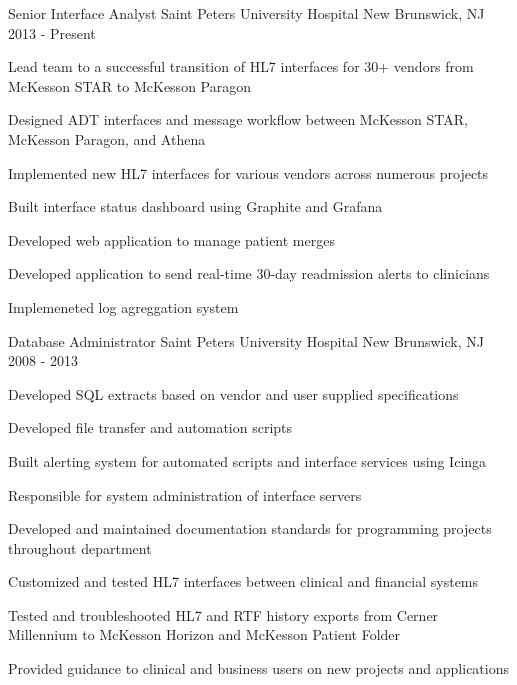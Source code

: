 

\begin{cventries}

  \cventry
  {Senior Interface Analyst} %
  {Saint Peters University Hospital} %
  {New Brunswick, NJ} %
  {2013 - Present} %
  {
    \begin{cvitems} %
      \item {Lead team to a successful transition of HL7 interfaces for 30+ vendors from McKesson STAR to McKesson Paragon}
      \item {Designed ADT interfaces and message workflow between McKesson STAR, McKesson Paragon, and Athena}
      \item {Implemented new HL7 interfaces for various vendors across numerous
          projects}
      \item {Built interface status dashboard using Graphite and Grafana}
      \item {Developed web application to manage patient merges}
      \item {Developed application to send real-time 30-day readmission alerts to clinicians}
      \item {Implemeneted log agreggation system}
    \end{cvitems}
  }

  \cventry
  {Database Administrator} %
  {Saint Peters University Hospital} %
  {New Brunswick, NJ} %
  {2008 - 2013} %
  {
    \begin{cvitems} %
      \item {Developed SQL extracts based on vendor and user supplied specifications}
      \item {Developed file transfer and automation scripts}
      \item {Built alerting system for automated scripts and interface services using Icinga}
      \item {Responsible for system administration of interface servers}
      \item {Developed and maintained documentation standards for programming projects throughout department}
      \item {Customized and tested HL7 interfaces between clinical and financial systems}
      \item {Tested and troubleshooted HL7 and RTF history exports from Cerner Millennium to McKesson Horizon and McKesson Patient Folder}
      \item {Provided guidance to clinical and business users on new projects and applications}
    \end{cvitems}
  }


\end{cventries}
